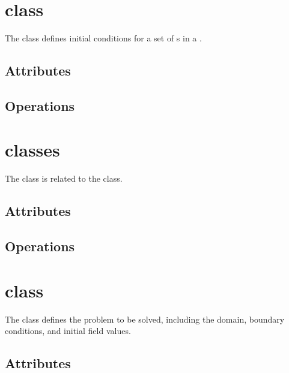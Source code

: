 \section{ class}

The  class defines initial conditions for a set of
s in a .


\subsection{Attributes}

\subsection{Operations}

\section{ classes}

The  class is related to the  class.


\subsection{Attributes}

\subsection{Operations}

\section{ class}

The  class defines the problem to be solved, including
the domain, boundary conditions, and initial field values.


\subsection{Attributes}

